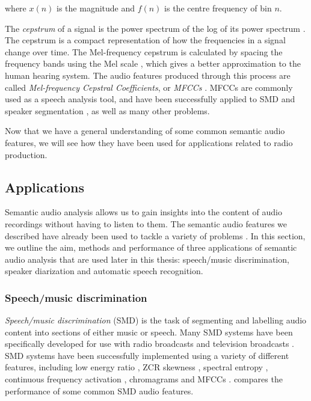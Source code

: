 where $x(n)$ is the magnitude and $f(n)$ is the centre frequency of bin $n$.

The \textit{cepstrum} of a signal is the power spectrum of the log of its power spectrum \citep{Noll1967}. The cepstrum
is a compact representation of how the frequencies in a signal change over time.  The Mel-frequency cepstrum is
calculated by spacing the frequency bands using the Mel scale \citep{Stevens1937}, which gives a better approximation
to the human hearing system. The audio features produced through this process are called \textit{Mel-frequency Cepstral
Coefficients}, or \textit{MFCCs} \citep{Imai1983}.
MFCCs are commonly used as a speech analysis tool, and have been successfully applied to SMD
\citep{Liang2005,Pikrakis2008,Pikrakis2006a,Sell2014,Wieser2014} and speaker segmentation
\citep{AngueraMiro2012,Friedland2009}, as well as many other problems.

Now that we have a general understanding of some common semantic audio features, we will see how they have been used for
applications related to radio production.







\subsection{Applications}

Semantic audio analysis allows us to gain insights into the content of audio recordings without having to listen to
them. The semantic audio features we described have already been used to tackle a variety of problems
\citep{Foote1999}.  In this section, we outline the aim, methods and performance of three applications of semantic
audio analysis that are used later in this thesis: speech/music discrimination, speaker diarization and automatic
speech recognition.



\subsubsection{Speech/music discrimination}

\textit{Speech/music discrimination} (SMD) is the task of segmenting and labelling audio content into sections of
either music or speech.  Many SMD systems have been specifically developed for use with radio broadcasts
\citep{Saunders1996,Pikrakis2006,Pikrakis2008,Ericsson2009,Wieser2014} and television broadcasts
\citep{Seyerlehner2007,Sell2014}.  SMD systems have been successfully implemented using a variety of different
features, including low energy ratio \citep{Ericsson2009}, ZCR skewness \citep{Saunders1996}, spectral entropy
\citep{Pikrakis2006}, continuous frequency activation \citep{Seyerlehner2007,Wieser2014}, chromagrams \citep{Sell2014}
and MFCCs \citep{Pikrakis2008}.  \citet{Carey1999} compares the performance of some common SMD audio features.

